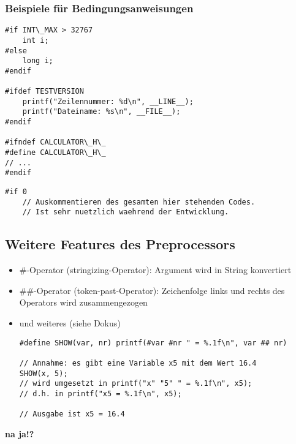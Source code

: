 \subsubsection{Beispiele für Bedingungsanweisungen}
\begin{multicols}{2}
\begin{minipage}{\linewidth}
\vspace{-\baselineskip}
\begin{lstlisting}
#if INT\_MAX > 32767
	int i;
#else
	long i;
#endif

#ifdef TESTVERSION
	printf("Zeilennummer: %d\n", __LINE__);
	printf("Dateiname: %s\n", __FILE__);
#endif

#ifndef CALCULATOR\_H\_
#define CALCULATOR\_H\_
// ...
#endif
\end{lstlisting}
\end{minipage}
\vfill\null
\columnbreak
\begin{minipage}{\linewidth}
\vspace{-\baselineskip}
\begin{lstlisting}
#if 0
	// Auskommentieren des gesamten hier stehenden Codes.
	// Ist sehr nuetzlich waehrend der Entwicklung.
\end{lstlisting}
\end{minipage}
\end{multicols}

\subsection{Weitere Features des Preprocessors}
\begin{itemize}
	\item \#-Operator (stringizing-Operator): Argument wird in String konvertiert
	\item \#\#-Operator (token-past-Operator): Zeichenfolge links und rechts des Operators wird zusammengezogen
	\item und weiteres (siehe Dokus)
	\begin{minipage}{\linewidth}
	\vspace{-\baselineskip}
\begin{lstlisting}
#define SHOW(var, nr) printf(#var #nr " = %.1f\n", var ## nr)

// Annahme: es gibt eine Variable x5 mit dem Wert 16.4
SHOW(x, 5);
// wird umgesetzt in printf("x" "5" " = %.1f\n", x5);
// d.h. in printf("x5 = %.1f\n", x5);

// Ausgabe ist x5 = 16.4
\end{lstlisting}
	\end{minipage}
\end{itemize}
\textbf{na ja!?}

